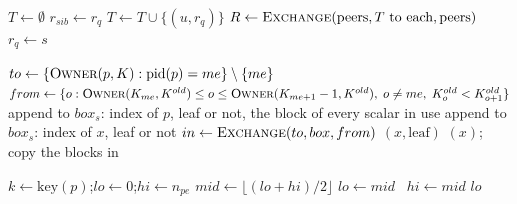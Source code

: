 \begin{algorithm}[H]
  \caption{\textsc{KeepFamilies}$(r)$: a family of leaves goes whole to
    its child~0's rank}
  \label{alg:family}
  \begin{algorithmic}[1]
    \State $T \gets \emptyset$ 
        \State $r_{sib} \gets r_q$ 
      \EndFor
        \State $T \gets T \cup \{(u, r_q)\}$
      \EndIf
    \EndFor
    \State $R \gets \textsc{Exchange}(\text{peers}, T \text{ to each},
      \text{peers})$ 
        \State $r_q \gets s$
      \EndFor
    \EndFor
  \end{algorithmic}
\end{algorithm}

\begin{algorithm}[H]
  \caption{\textsc{Migrate}$(K^{old}, K)$: every node to its new owner,
    in one round}
  \label{alg:migrate}
  \begin{algorithmic}[1]
    \State $to \gets \{\textsc{Owner}(p, K) : \mathrm{pid}(p) = me\} \setminus
      \{me\}$ 
    \State $from \gets \{o : \textsc{Owner}(K_{me}, K^{old}) \le o \le
      \textsc{Owner}(K_{me+1} - 1, K^{old}),\; o \ne me,\; K^{old}_o <
      K^{old}_{o+1}\}$
    \Statex {}
      \State append to $box_s$: index of $p$, leaf or not, the block of
        every scalar in use
        \State append to $box_s$: index of $x$, leaf or not
      \EndFor
    \EndFor
    \State $in \gets \textsc{Exchange}(to, box, from)$
      \State {}$(x, \text{leaf})$ 
        \State {}$(x)$; copy the blocks in
      \EndIf
    \EndFor
  \end{algorithmic}
\end{algorithm}

\begin{algorithm}[H]
  \caption{\textsc{Owner}$(p, K)$ (): the
    rank whose piece holds $p$, no message}
  \label{alg:owner}
  \begin{algorithmic}[1]
    \State $k \gets \mathrm{key}(p)$;\quad $lo \gets 0$;\quad $hi \gets n_{pe}$
      \State $mid \gets \lfloor (lo + hi)/2 \rfloor$
       $lo \gets mid$ \Else\ $hi \gets mid$ \EndIf
    \EndWhile
    \State \Return $lo$ 
  \end{algorithmic}
\end{algorithm}

